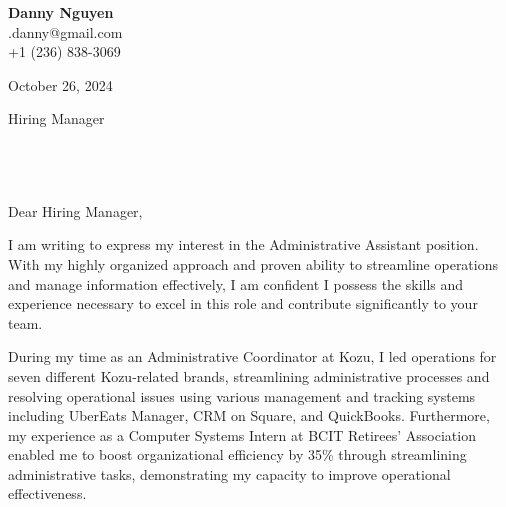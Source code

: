 \documentclass[letterpaper,11pt]{article}
\begin{document}
\textbf{Danny Nguyen} \\ %
\tdn.danny@gmail.com \\ %
+1 (236) 838-3069 \\ %
\vspace{20pt}

October 26, 2024 \\
\vspace{20pt}

Hiring Manager \\ %
\\
\\
\\
\vspace{20pt}

Dear Hiring Manager, \\ %
\vspace{10pt}

\vspace{10pt}
I am writing to express my interest in the Administrative Assistant position. With my highly organized approach and proven ability to streamline operations and manage information effectively, I am confident I possess the skills and experience necessary to excel in this role and contribute significantly to your team.

\vspace{10pt}
During my time as an Administrative Coordinator at Kozu, I led operations for seven different Kozu-related brands, streamlining administrative processes and resolving operational issues using various management and tracking systems including UberEats Manager, CRM on Square, and QuickBooks. Furthermore, my experience as a Computer Systems Intern at BCIT Retirees' Association enabled me to boost organizational efficiency by 35\% through streamlining administrative tasks, demonstrating my capacity to improve operational effectiveness.
\end{document}
